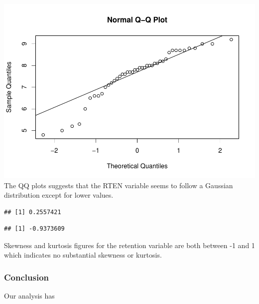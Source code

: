 \documentclass[]{article}
\newenvironment{Shaded}{\begin{snugshade}}{\end{snugshade}}
\newcommand{\KeywordTok}[1]{\textcolor[rgb]{0.13,0.29,0.53}{\textbf{#1}}}
\newcommand{\NormalTok}[1]{#1}
\newcommand{\OperatorTok}[1]{\textcolor[rgb]{0.81,0.36,0.00}{\textbf{#1}}}
\begin{document}
\includegraphics{Homework_Adrien_Toulouse_Paul-Antoine_Girard_files/figure-latex/QQ plot-1.pdf}
The QQ plots suggests that the RTEN variable seems to follow a Gaussian
distribution except for lower values.

\begin{Shaded}
\end{Shaded}

\begin{verbatim}
## [1] 0.2557421
\end{verbatim}

\begin{Shaded}
\end{Shaded}

\begin{verbatim}
## [1] -0.9373609
\end{verbatim}

Skewness and kurtosis figures for the retention variable are both
between -1 and 1 which indicates no substantial skewness or kurtosis.

\hypertarget{conclusion}{%
\subsubsection{Conclusion}\label{conclusion}}

Our analysis has
\end{document}
